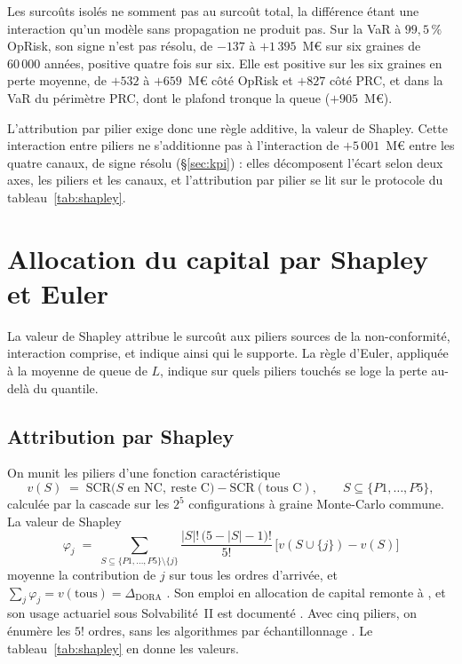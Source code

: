 Les surcoûts isolés ne somment pas au surcoût total, la différence étant une interaction qu'un modèle sans
propagation ne produit pas. Sur la VaR à $99{,}5\,\%$ OpRisk, son signe n'est pas résolu, de $-137$ à
$+1\,395$~M\euro{} sur six graines de $60\,000$ années, positive quatre fois sur six. Elle est
positive sur les six graines en perte moyenne, de $+532$ à $+659$~M\euro{} côté OpRisk et $+827$
côté PRC, et dans la VaR du périmètre PRC, dont le plafond tronque la queue ($+905$~M\euro).

L'attribution par pilier exige donc une règle additive, la valeur de Shapley. Cette
interaction entre piliers ne s'additionne pas à l'interaction de $+5\,001$~M\euro{} entre les quatre
canaux, de signe résolu (\S\ref{sec:kpi}) : elles décomposent l'écart selon deux axes, les piliers et
les canaux, et l'attribution par pilier se lit sur le protocole du tableau~\ref{tab:shapley}.

\section{Allocation du capital par Shapley et Euler}
\label{sec:allocation}

La valeur de Shapley attribue le surcoût aux piliers sources de la non-conformité, interaction
comprise, et indique ainsi qui le supporte. La règle d'Euler, appliquée à la moyenne de queue
de $L$, indique sur quels piliers touchés se loge la perte au-delà du quantile.

\subsection{Attribution par Shapley}

On munit les piliers d'une fonction caractéristique
\[
v(S) \;=\; \mathrm{SCR}\bigl(S \text{ en NC},\ \text{reste C}\bigr)-\mathrm{SCR}(\text{tous C}),
\qquad S \subseteq \{P1,\dots,P5\},
\]
calculée par la cascade sur les $2^5$ configurations à graine Monte-Carlo commune. La valeur de
Shapley
\[
\varphi_j \;=\; \sum_{S \subseteq \{P1,\dots,P5\}\setminus\{j\}}
\frac{|S|!\,\bigl(5-|S|-1\bigr)!}{5!}\,\bigl[v(S\cup\{j\})-v(S)\bigr]
\]
moyenne la contribution de $j$ sur tous les ordres d'arrivée, et
$\sum_j \varphi_j = v(\text{tous}) = \Delta_{\text{DORA}}$ \citep{Shapley1953}. Son
emploi en allocation de capital remonte à \citet{denault2001}, et son usage actuariel sous
Solvabilité~II est documenté \citep{Decupere2011}. Avec cinq piliers, on énumère les $5!$
ordres, sans les algorithmes par échantillonnage \citep{CastroGomezTejada2009, SongNelsonStaum2016}.
Le tableau~\ref{tab:shapley} en donne les valeurs.

